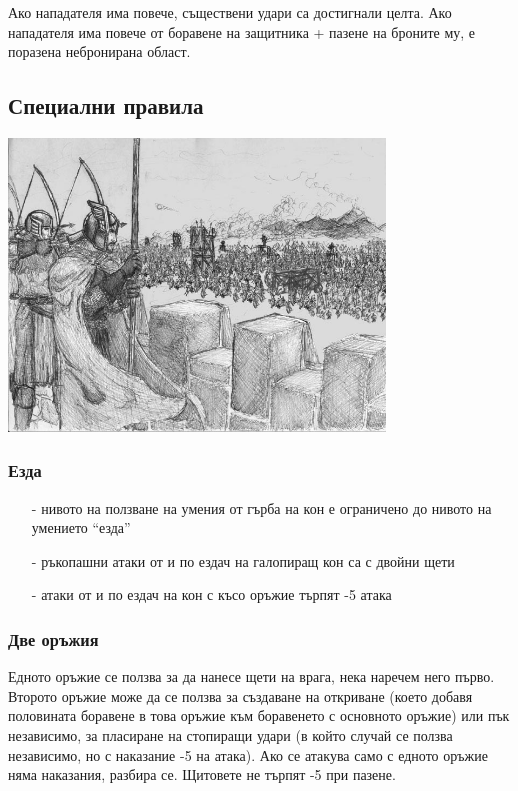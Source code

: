 Ако нападателя има повече, съществени удари са достигнали целта.
Ако нападателя има повече от боравене на защитника + пазене на броните му, е поразена небронирана област.

\subsection{Специални правила}
\begin{center}
\includegraphics[width=0.75\textwidth]{../images/siege}~
\\[1cm]
\end{center}

\subsubsection{Езда}
\begin{itemize}
\item[-]{нивото на ползване на умения от гърба на кон е ограничено до нивото на умението “езда”}
\item[-]{ръкопашни атаки от и по ездач на галопиращ кон са с двойни щети}
\item[-]{атаки от и по ездач на кон с късо оръжие търпят -5 атака}
\end{itemize}

\subsubsection{Две оръжия}
Едното оръжие се ползва за да нанесе щети на врага, нека наречем него първо.
Второто оръжие може да се ползва за създаване на откриване (което добавя половината боравене в това оръжие към боравенето с основното оръжие) или пък независимо, за пласиране на стопиращи удари (в който случай се ползва независимо, но с наказание -5 на атака).
Ако се атакува само с едното оръжие няма наказания, разбира се.
Щитовете не търпят -5 при пазене.

